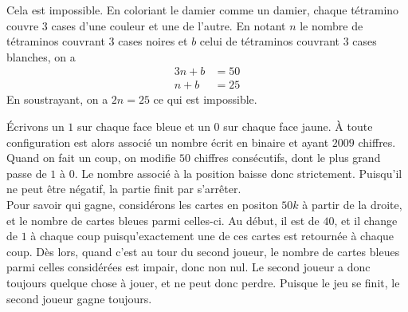 \begin{sol}
Cela est impossible. En coloriant le damier comme un damier, chaque tétramino couvre $3$ cases d'une couleur et une de l'autre. En notant $n$ le nombre de tétraminos couvrant $3$ cases noires et $b$ celui de tétraminos couvrant $3$ cases blanches, on a
\begin{align*}
3n+b&=50\\
n+b&=25
\end{align*}
En soustrayant, on a $2n=25$ ce qui est impossible.
\end{sol}


\begin{sol}
Écrivons un $1$ sur chaque face bleue et un $0$ sur chaque face jaune. À toute configuration est alors associé un nombre écrit en binaire et ayant $2009$ chiffres. Quand on fait un coup, on modifie $50$ chiffres consécutifs, dont le plus grand passe de $1$ à $0$. Le nombre associé à la position baisse donc strictement. Puisqu'il ne peut être négatif, la partie finit par s'arrêter.\\
Pour savoir qui gagne, considérons les cartes en positon $50k$ à partir de la droite, et le nombre de cartes bleues parmi celles-ci. Au début, il est de $40$, et il change de $1$ à chaque coup puisqu'exactement une de ces cartes est retournée à chaque coup. Dès lors, quand c'est au tour du second joueur, le nombre de cartes bleues parmi celles considérées est impair, donc non nul. Le second joueur a donc toujours quelque chose à jouer, et ne peut donc perdre. Puisque le jeu se finit, le second joueur gagne toujours.
\end{sol}


